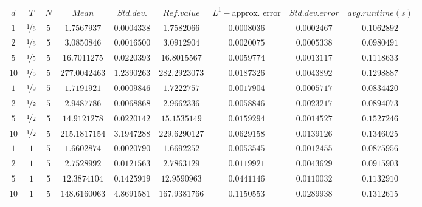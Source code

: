 \begin{tabular}{ccccccccc}
$d$ & $T$ & $N$ & $Mean$ & $Std. dev.$ & $Ref. value$ & $L^1-$approx. error & $Std. dev. error$ & $avg. runtime (s)$\\
$1$ & $\nicefrac{1}{5}$ & $5$ & $1.7567937$ & $0.0004338$ & $1.7582066$ & $0.0008036$ & $0.0002467$ & $0.1062892$\\
$2$ & $\nicefrac{1}{5}$ & $5$ & $3.0850846$ & $0.0016500$ & $3.0912904$ & $0.0020075$ & $0.0005338$ & $0.0980491$\\
$5$ & $\nicefrac{1}{5}$ & $5$ & $16.7011275$ & $0.0220393$ & $16.8015567$ & $0.0059774$ & $0.0013117$ & $0.1118633$\\
$10$ & $\nicefrac{1}{5}$ & $5$ & $277.0042463$ & $1.2390263$ & $282.2923073$ & $0.0187326$ & $0.0043892$ & $0.1298887$\\
$1$ & $\nicefrac{1}{2}$ & $5$ & $1.7191921$ & $0.0009846$ & $1.7222757$ & $0.0017904$ & $0.0005717$ & $0.0834420$\\
$2$ & $\nicefrac{1}{2}$ & $5$ & $2.9487786$ & $0.0068868$ & $2.9662336$ & $0.0058846$ & $0.0023217$ & $0.0894073$\\
$5$ & $\nicefrac{1}{2}$ & $5$ & $14.9121278$ & $0.0220142$ & $15.1535149$ & $0.0159294$ & $0.0014527$ & $0.1527246$\\
$10$ & $\nicefrac{1}{2}$ & $5$ & $215.1817154$ & $3.1947288$ & $229.6290127$ & $0.0629158$ & $0.0139126$ & $0.1346025$\\
$1$ & $1$ & $5$ & $1.6602874$ & $0.0020790$ & $1.6692252$ & $0.0053545$ & $0.0012455$ & $0.0875956$\\
$2$ & $1$ & $5$ & $2.7528992$ & $0.0121563$ & $2.7863129$ & $0.0119921$ & $0.0043629$ & $0.0915903$\\
$5$ & $1$ & $5$ & $12.3874104$ & $0.1425919$ & $12.9590963$ & $0.0441146$ & $0.0110032$ & $0.1132910$\\
$10$ & $1$ & $5$ & $148.6160063$ & $4.8691581$ & $167.9381766$ & $0.1150553$ & $0.0289938$ & $0.1312615$\\
\end{tabular}
